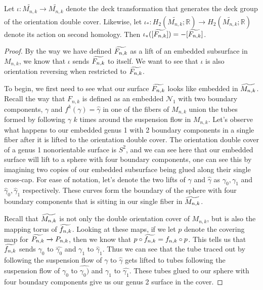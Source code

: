 \begin{lem}
Let $\iota: \widetilde{M_{n,k}} \xrightarrow[]{} \widetilde{M_{n,k}}$ denote the deck transformation that generates the deck group of the orientation double cover. Likewise, let $\iota_*: H_2(\widetilde{M_{n,k}};\mathbb{R}) \xrightarrow[]{} H_2(\widetilde{M_{n,k}};\mathbb{R})$ denote its action on second homology. Then $\iota_*([\widetilde{F_{n,k}}]) = -[\widetilde{F_{n,k}}]$.
\end{lem}
\begin{proof}

By the way we have defined $\widetilde{F_{n,k}}$ as a lift of an embedded subsurface in $M_{n,k}$, we know that $\iota$ sends $\widetilde{F_{n,k}}$ to itself. We want to see that $\iota$ is also orientation reversing when restricted to $\widetilde{F_{n,k}}$.

To begin, we first need to see what our surface $\widetilde{F_{n,k}}$ looks like embedded in $\widetilde{M_{n,k}}$. Recall the way that $F_{n,k}$ is defined as an embedded $\mathcal{N}_1$ with two boundary components, $\gamma$ and $f^k(\gamma) = \hat{\gamma}$ in one of the fibers of $M_{n,k}$ union the tubes formed by following $\gamma$ $k$ times around the suspension flow in $M_{n,k}$. Let's observe what happens to our embedded genus 1 with 2 boundary components in a single fiber after it is lifted to the orientation double cover. The orientation double cover of a genus 1 nonorientable surface is $S^2$, and we can see here that our embedded surface will lift to a sphere with four boundary components, one can see this by imagining two copies of our embedded subsurface being glued along their single cross-cap. For ease of notation, let's denote the two lifts of $\gamma$ and $\hat{\gamma}$ as $\gamma_0,\gamma_1$ and $\hat{\gamma}_0,\hat{\gamma}_1$ respectively. These curves form the boundary of the sphere with four boundary components that is sitting in our single fiber in $\widetilde{M_{n,k}}$.

Recall that $\widetilde{M_{n,k}}$ is not only the double orientation cover of $M_{n,k}$, but is also the mapping torus of $\widetilde{f_{n,k}}$. Looking at these maps, if we let $p$ denote the covering map for $\widetilde{P_{n,k}} \xrightarrow[]{} P_{n,k}$, then we know that $p \circ \widetilde{f_{n,k}} = f_{n,k} \circ p$. This tells us that $\widetilde{f_{n,k}}$ sends $\gamma_0$ to $\hat{\gamma_0}$ and $\gamma_1$ to $\hat{\gamma}_1$. Thus we can see that the tube traced out by following the suspension flow of $\gamma$ to $\hat{\gamma}$ gets lifted to tubes following the suspension flow of $\gamma_0$ to $\hat{\gamma_0)}$ and $\gamma_1$ to $\hat{\gamma_1}$. These tubes glued to our sphere with four boundary components give us our genus 2 surface in the cover.


\end{proof}
